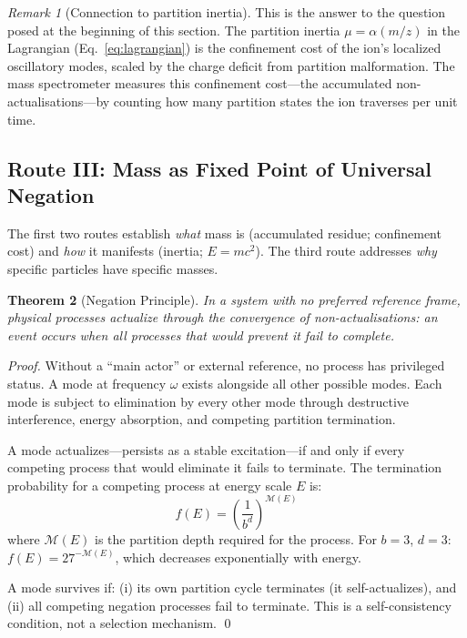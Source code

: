 \documentclass[twocolumn,10pt,a4paper]{article}
\newtheorem{theorem}{Theorem}[section]
\theoremstyle{definition}
\theoremstyle{remark}
\newtheorem{remark}[theorem]{Remark}
\newcommand{\Depth}{\mathcal{M}}
\newcommand{\partinert}{\mu}
\begin{document}
\begin{remark}[Connection to partition inertia]
This is the answer to the question posed at the beginning of this section. The partition inertia $\partinert = \alpha(m/z)$ in the Lagrangian (Eq.~\ref{eq:lagrangian}) is the confinement cost of the ion's localized oscillatory modes, scaled by the charge deficit from partition malformation. The mass spectrometer measures this confinement cost---the accumulated non-actualisations---by counting how many partition states the ion traverses per unit time.
\end{remark}

\subsection{Route III: Mass as Fixed Point of Universal Negation}

The first two routes establish \emph{what} mass is (accumulated residue; confinement cost) and \emph{how} it manifests (inertia; $E = mc^2$). The third route addresses \emph{why} specific particles have specific masses.

\begin{theorem}[Negation Principle]
\label{thm:negation}
In a system with no preferred reference frame, physical processes actualize through the convergence of non-actualisations: an event occurs when all processes that would prevent it fail to complete.
\end{theorem}

\begin{proof}
Without a ``main actor'' or external reference, no process has privileged status. A mode at frequency $\omega$ exists alongside all other possible modes. Each mode is subject to elimination by every other mode through destructive interference, energy absorption, and competing partition termination.

A mode actualizes---persists as a stable excitation---if and only if every competing process that would eliminate it fails to terminate. The termination probability for a competing process at energy scale $E$ is:
\begin{equation}
    f(E) = \left(\frac{1}{b^d}\right)^{\Depth(E)}
\end{equation}
where $\Depth(E)$ is the partition depth required for the process. For $b = 3$, $d = 3$: $f(E) = 27^{-\Depth(E)}$, which decreases exponentially with energy.

A mode survives if: (i) its own partition cycle terminates (it self-actualizes), and (ii) all competing negation processes fail to terminate. This is a self-consistency condition, not a selection mechanism. \qed
\end{proof}
\end{document}
